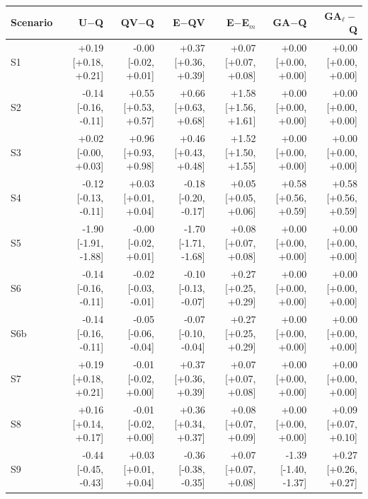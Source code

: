 \begin{tabular}{@{}lrrrrrr@{}}
\toprule
Scenario & U$-$Q & QV$-$Q & E$-$QV & E$-$E$_m$ & GA$-$Q & GA$_\ell-$Q \\
\midrule
S1 & +0.19 [+0.18, +0.21] & -0.00 [-0.02, +0.01] & +0.37 [+0.36, +0.39] & +0.07 [+0.07, +0.08] & +0.00 [+0.00, +0.00] & +0.00 [+0.00, +0.00] \\
S2 & -0.14 [-0.16, -0.11] & +0.55 [+0.53, +0.57] & +0.66 [+0.63, +0.68] & +1.58 [+1.56, +1.61] & +0.00 [+0.00, +0.00] & +0.00 [+0.00, +0.00] \\
S3 & +0.02 [-0.00, +0.03] & +0.96 [+0.93, +0.98] & +0.46 [+0.43, +0.48] & +1.52 [+1.50, +1.55] & +0.00 [+0.00, +0.00] & +0.00 [+0.00, +0.00] \\
S4 & -0.12 [-0.13, -0.11] & +0.03 [+0.01, +0.04] & -0.18 [-0.20, -0.17] & +0.05 [+0.05, +0.06] & +0.58 [+0.56, +0.59] & +0.58 [+0.56, +0.59] \\
S5 & -1.90 [-1.91, -1.88] & -0.00 [-0.02, +0.01] & -1.70 [-1.71, -1.68] & +0.08 [+0.07, +0.08] & +0.00 [+0.00, +0.00] & +0.00 [+0.00, +0.00] \\
S6 & -0.14 [-0.16, -0.11] & -0.02 [-0.03, -0.01] & -0.10 [-0.13, -0.07] & +0.27 [+0.25, +0.29] & +0.00 [+0.00, +0.00] & +0.00 [+0.00, +0.00] \\
S6b & -0.14 [-0.16, -0.11] & -0.05 [-0.06, -0.04] & -0.07 [-0.10, -0.04] & +0.27 [+0.25, +0.29] & +0.00 [+0.00, +0.00] & +0.00 [+0.00, +0.00] \\
S7 & +0.19 [+0.18, +0.21] & -0.01 [-0.02, +0.00] & +0.37 [+0.36, +0.39] & +0.07 [+0.07, +0.08] & +0.00 [+0.00, +0.00] & +0.00 [+0.00, +0.00] \\
S8 & +0.16 [+0.14, +0.17] & -0.01 [-0.02, +0.00] & +0.36 [+0.34, +0.37] & +0.08 [+0.07, +0.09] & +0.00 [+0.00, +0.00] & +0.09 [+0.07, +0.10] \\
S9 & -0.44 [-0.45, -0.43] & +0.03 [+0.01, +0.04] & -0.36 [-0.38, -0.35] & +0.07 [+0.07, +0.08] & -1.39 [-1.40, -1.37] & +0.27 [+0.26, +0.27] \\
\bottomrule
\end{tabular}